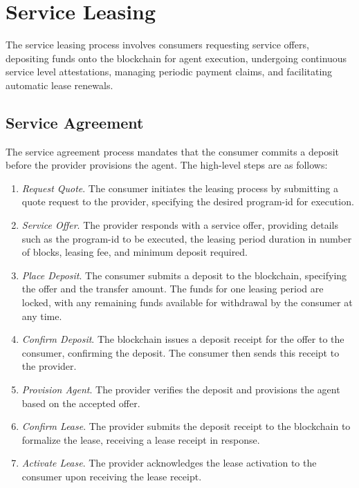 \documentclass{oc}
\begin{document}
\section{Service Leasing}\label{sec:leasing}

The service leasing process involves consumers requesting service offers, depositing funds onto the blockchain for \gls{agent} execution, undergoing continuous service level attestations, managing periodic payment claims, and facilitating automatic lease renewals.

\subsection{Service Agreement}\label{sec:service-agreement}

The service agreement process mandates that the \gls{consumer} commits a deposit before the \gls{provider} provisions the \gls{agent}.
The high-level steps are as follows:

\begin{enumerate}
  \item \emph{Request Quote}. The \gls{consumer} initiates the leasing process by submitting a quote request to the \gls{provider}, specifying the desired \gls{program-id} for execution.
  
  \item \emph{Service Offer}. The \gls{provider} responds with a service offer, providing details such as the \gls{program-id} to be executed, the leasing period duration in number of blocks, leasing fee, and minimum deposit required.
  
  \item \emph{Place Deposit}. The \gls{consumer} submits a deposit to the blockchain, specifying the offer and the transfer amount. The funds for one leasing period are locked, with any remaining funds available for withdrawal by the consumer at any time.
  
  \item \emph{Confirm Deposit}. The blockchain issues a deposit receipt for the offer to the \gls{consumer}, confirming the deposit. The \gls{consumer} then sends this receipt to the \gls{provider}.
  
  \item \emph{Provision Agent}. The \gls{provider} verifies the deposit and provisions the \gls{agent} based on the accepted offer.
  
  \item \emph{Confirm Lease}. The \gls{provider} submits the deposit receipt to the blockchain to formalize the lease, receiving a lease receipt in response.
  
  \item \emph{Activate Lease}. The \gls{provider} acknowledges the lease activation to the \gls{consumer} upon receiving the lease receipt.
\end{enumerate}
\end{document}
